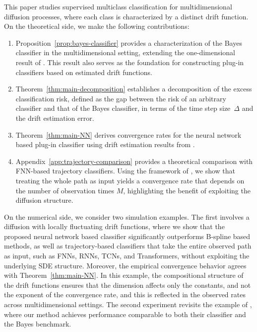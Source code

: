 \documentclass{article}
\theoremstyle{plain}
\theoremstyle{definition}
\theoremstyle{remark}
\begin{document}
This paper studies supervised multiclass classification for multidimensional diffusion processes, where each class is characterized by a distinct drift function. On the theoretical side, we make the following contributions:
\begin{enumerate}
\item Proposition~\ref{prop:bayes-classifier} provides a characterization of the Bayes classifier in the multidimensional setting, extending the one-dimensional result of \citet[Proposition~1]{Denis2020}. This result also serves as the foundation for constructing plug-in classifiers based on estimated drift functions.
\item Theorem~\ref{thm:main-decomposition} establishes a decomposition of the excess classification risk, defined as the gap between the risk of an arbitrary classifier and that of the Bayes classifier, in terms of the time step size~$\Delta$ and the drift estimation error.
\item Theorem~\ref{thm:main-NN} derives convergence rates for the neural network based plug-in classifier using drift estimation results from \citet{zhao2025drift}.
\item  Appendix~\ref{app:trajectory-comparison} provides a theoretical comparison with FNN-based trajectory classifiers. Using the framework of \citet{bos2022}, we show that treating the whole path as input yields a convergence rate that depends on the number of observation times \(M\), highlighting the benefit of exploiting the diffusion structure. 
\end{enumerate}

On the numerical side, we consider two simulation examples. The first involves a diffusion with locally fluctuating drift functions, where we show that the proposed neural network based classifier significantly outperforms B-spline based methods,  as well as trajectory-based classifiers that take the entire observed path as input, such as FNNs, RNNs, TCNs, and Transformers, without exploiting the underlying SDE structure. 
Moreover, the empirical convergence behavior agrees with Theorem~\ref{thm:main-NN}. In this example, the compositional structure of the drift functions ensures that the dimension affects only the constants, and not the exponent of the convergence rate, and this is reflected in the observed rates across multidimensional settings. 
The second experiment revisits the example of \citet{Denis2024}, where our method achieves performance comparable to both their classifier and the Bayes benchmark.
\end{document}
